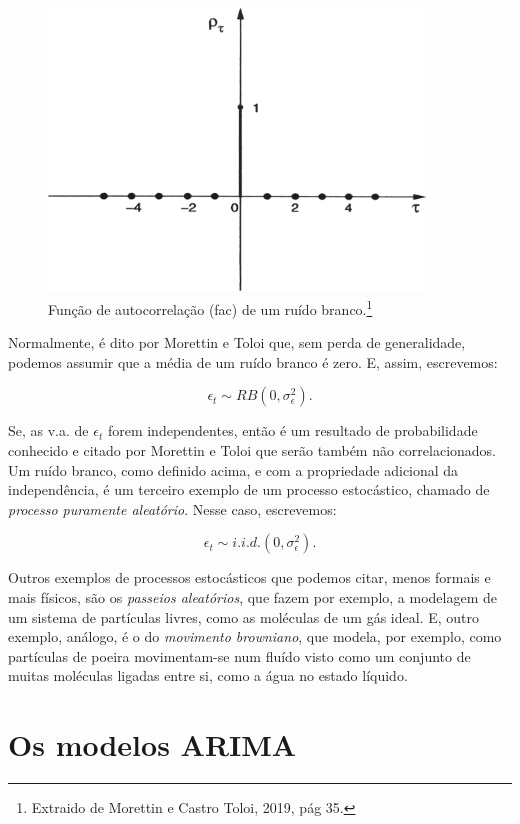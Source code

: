 \begin{figure}[htb]
\centering
\includegraphics[width=10cm]{figuras/fac_ruido}
\caption{Função de autocorrelação (fac) de um ruído branco.\footnote{Extraido de Morettin e Castro Toloi, 2019, pág 35.}}
\label{fig:fac_ruido}
\end{figure}

Normalmente, é dito por Morettin e Toloi \citep{morettin} que, sem perda de generalidade, podemos assumir que a média de um ruído branco é zero. E, assim, escrevemos:

\[ \epsilon_t \sim RB (0, \sigma_\epsilon^2). \]

Se, as v.a. de $\epsilon_t$ forem independentes, então é um resultado de probabilidade conhecido e citado por Morettin e Toloi \citep{morettin} que serão também não correlacionados. Um ruído branco, como definido acima, e com a propriedade adicional da independência, é um terceiro exemplo de um processo estocástico, chamado de \emph{processo puramente aleatório}. Nesse caso, escrevemos:

\[ \epsilon_t \sim i.i.d. (0, \sigma_\epsilon^2). \]

Outros exemplos de processos estocásticos que podemos citar, menos formais e mais físicos, são os \emph{passeios aleatórios}, que fazem por exemplo, a modelagem de um sistema de partículas livres, como as moléculas de um gás ideal. E, outro exemplo, análogo, é o do \emph{movimento browniano}, que modela, por exemplo, como partículas de poeira movimentam-se num fluído visto como um conjunto de muitas moléculas ligadas entre si, como a água no estado líquido.

\section{Os modelos ARIMA}

